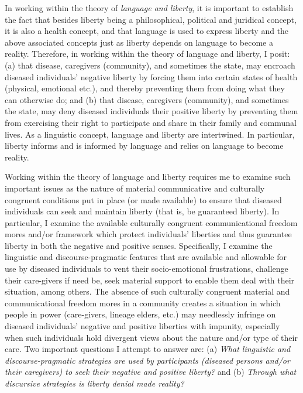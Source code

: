 \documentclass[output=paper,colorlinks,citecolor=brown]{langscibook}
\begin{document}
In working within the theory of \textit{language and liberty}, it is important to establish the fact that besides liberty being a philosophical, political and juridical concept, it is also a health concept, and that language is used to express liberty and the above associated concepts just as liberty depends on language to become a reality. Therefore, in working within the theory of language and liberty, I posit: (a) that disease, caregivers (community), and sometimes the state, may encroach diseased individuals’ negative liberty by forcing them into certain states of health (physical, emotional etc.), and thereby preventing them from doing what they can otherwise do; and (b) that disease, caregivers (community), and sometimes the state, may deny diseased individuals their positive liberty by preventing them from exercising their right to participate and share in their family and communal lives. As a linguistic concept, language and liberty are intertwined. In particular, liberty informs and is informed by language and relies on language to become reality. 

Working within the theory of language and liberty requires me to examine such important issues as the nature of material communicative and culturally congruent conditions put in place (or made available) to ensure that diseased individuals can seek and maintain liberty (that is, be guaranteed liberty). In particular, I examine the available culturally congruent communicational freedom mores and/or framework which protect individuals’ liberties and thus guarantee liberty in both the negative and positive senses. Specifically, I examine the linguistic and discourse-pragmatic features that are available and allowable for use by diseased individuals to vent their socio-emotional frustrations, challenge their care-givers if need be, seek material support to enable them deal with their situation, among others. The absence of such culturally congruent material and communicational freedom mores in a community creates a situation in which people in power (care-givers, lineage elders, etc.) may needlessly infringe on diseased individuals’ negative and positive liberties with impunity, especially when such individuals hold divergent views about the nature and/or type of their care. Two important questions I attempt to answer are: (a) \textit{What linguistic and discourse-pragmatic strategies are used by participants (diseased persons and/or their caregivers) to seek their negative and positive liberty?} and (b) \textit{Through what discursive strategies is liberty denial made reality?}
\end{document}
